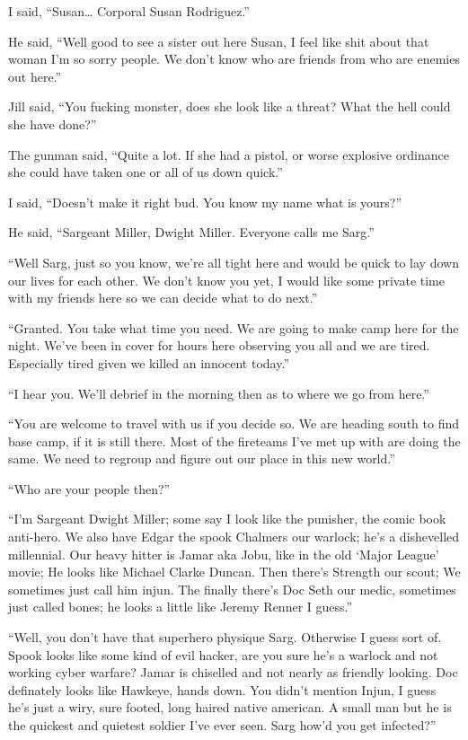 I said, ``Susan\dots{} Corporal Susan Rodriguez.''

He said, ``Well good to see a sister out here Susan, I feel like shit about that woman I'm so sorry people. We don't know who are friends from who are enemies out here.''

Jill said, ``You fucking monster, does she look like a threat? What the hell could she have done?''

The gunman said, ``Quite a lot. If she had a pistol, or worse explosive ordinance she could have taken one or all of us down quick.''

I said, ``Doesn't make it right bud. You know my name what is yours?''

He said, ``Sargeant Miller, Dwight Miller. Everyone calls me Sarg.''

``Well Sarg, just so you know, we're all tight here and would be quick to lay down our lives for each other. We don't know you yet, I would like some private time with my friends here so we can decide what to do next.''

``Granted. You take what time you need. We are going to make camp here for the night. We've been in cover for hours here observing you all and we are tired. Especially tired given we killed an innocent today.''

``I hear you. We'll debrief in the morning then as to where we go from here.''

``You are welcome to travel with us if you decide so. We are heading south to find base camp, if it is still there. Most of the fireteams I've met up with are doing the same. We need to regroup and figure out our place in this new world.''

``Who are your people then?''

``I'm Sargeant Dwight Miller; some say I look like the punisher, the comic book anti-hero. We also have Edgar the spook Chalmers our warlock; he's a dishevelled millennial. Our heavy hitter is Jamar aka Jobu, like in the old `Major League' movie; He looks like Michael Clarke Duncan. Then there's Strength our scout; We sometimes just call him injun. The finally there's Doc Seth our medic, sometimes just called bones; he looks a little like Jeremy Renner I guess.''

``Well, you don't have that superhero physique Sarg. Otherwise I guess sort of. Spook looks like some kind of evil hacker, are you sure he's a warlock and not working cyber warfare? Jamar is chiselled and not nearly as friendly looking. Doc definately looks like Hawkeye, hands down. You didn't mention Injun, I guess he's just a wiry, sure footed, long haired native american. A small man but he is the quickest and quietest soldier I've ever seen. Sarg how'd you get infected?''

